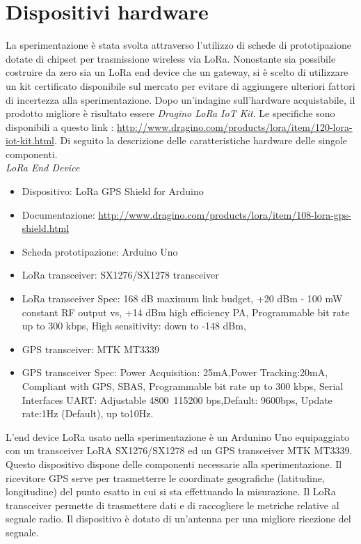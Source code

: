 \documentclass[12pt,a4paper,openright,twoside]{report}
\begin{document}
\section{Dispositivi hardware}
La sperimentazione \`e stata svolta attraverso l'utilizzo di schede di prototipazione dotate di chipset per trasmissione wireless via LoRa.
Nonostante sia possibile costruire da zero sia un LoRa end device che un gateway, si \`e scelto di utilizzare un kit certificato disponibile sul mercato per evitare di aggiungere ulteriori fattori di incertezza alla sperimentazione.
Dopo un'indagine sull'hardware acquistabile, il prodotto migliore \`e risultato essere \textit{Dragino LoRa IoT Kit}. 
Le specifiche sono disponibili a questo link : \url{http://www.dragino.com/products/lora/item/120-lora-iot-kit.html}.
Di seguito la descrizione delle caratteristiche hardware delle singole componenti. \
\\

\textit{LoRa End Device}
\begin{itemize}
    \item Dispositivo: LoRa GPS Shield for Arduino
    \item Documentazione: \url{http://www.dragino.com/products/lora/item/108-lora-gps-shield.html}
    \item Scheda prototipazione: Arduino Uno
    \item LoRa transceiver: SX1276/SX1278 transceiver
    \item LoRa transceiver Spec: 168 dB maximum link budget, +20 dBm - 100 mW constant RF output vs, +14 dBm high efficiency PA, Programmable bit rate up to 300 kbps, High sensitivity: down to -148 dBm, 
    \item GPS transceiver: MTK MT3339
    \item GPS transceiver Spec: Power Acquisition: 25mA,Power Tracking:20mA, Compliant with GPS, SBAS, Programmable bit rate up to 300 kbps, Serial Interfaces UART: Adjustable 4800~115200 bps,Default: 9600bps, Update rate:1Hz (Default), up to10Hz.
\end{itemize}

L'end device LoRa usato nella sperimentazione \`e un Ardunino Uno equipaggiato con un transceiver LoRA SX1276/SX1278 ed un GPS transceiver MTK MT3339. Questo dispositivo dispone delle componenti necessarie alla sperimentazione. Il ricevitore GPS serve per trasmetterre le coordinate geografiche (latitudine, longitudine) del punto esatto in cui si sta effettuando la misurazione. Il LoRa transceiver permette di trasmettere dati e di raccogliere le metriche relative al segnale radio. Il dispositivo \`e dotato di un'antenna per una migliore ricezione del segnale.  
\end{document}
